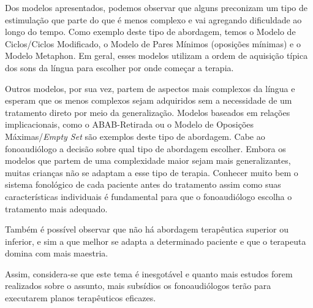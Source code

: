 \documentclass[output=paper,colorlinks,citecolor=brown,booklanguage=portuguese]{langscibook}
\begin{document}
Dos modelos apresentados, podemos observar que alguns preconizam um tipo de estimulação que parte do que é menos complexo e vai agregando dificuldade ao longo do tempo. Como exemplo deste tipo de abordagem, temos o Modelo de Ciclos/Ciclos Modificado, o Modelo de Pares Mínimos (oposições mínimas) e o Modelo Metaphon. Em geral, esses modelos utilizam a ordem de aquisição típica dos sons da língua para escolher por onde começar a terapia.

Outros modelos, por sua vez, partem de aspectos mais complexos da língua e esperam que os menos complexos sejam adquiridos sem a necessidade de um tratamento direto por meio da generalização. Modelos baseados em relações implicacionais, como o ABAB-Retirada ou o Modelo de Oposições Máximas/\emph{Empty Set} são exemplos deste tipo de abordagem. Cabe ao fonoaudiólogo a decisão sobre qual tipo de abordagem escolher. Embora os modelos que partem de uma complexidade maior sejam mais generalizantes, muitas crianças não se adaptam a esse tipo de terapia. Conhecer muito bem o sistema fonológico de cada paciente antes do tratamento assim como suas características individuais é fundamental para que o fonoaudiólogo escolha o tratamento mais adequado. 

Também é possível observar que não há abordagem terapêutica superior ou inferior, e sim a que melhor se adapta a determinado paciente e que o terapeuta domina com mais maestria.

Assim, considera-se que este tema é inesgotável e quanto mais estudos forem realizados sobre o assunto, mais subsídios os fonoaudiólogos terão para executarem planos terapêuticos eficazes.

\largerpage
{\sloppy\printbibliography[heading=subbibliography,notkeyword=this]}
\end{document}
